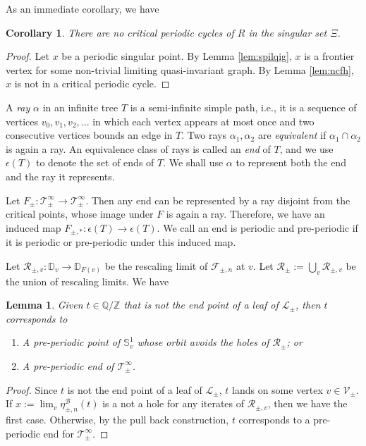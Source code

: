 \documentclass[11pt, reqno]{amsart}
\numberwithin{equation}{section}
\theoremstyle{plain}
\theoremstyle{theorem}
\newtheorem{lem}[theorem]{Lemma}
\newtheorem{cor}[theorem]{Corollary}
\theoremstyle{definition}
\newcommand{\Q}{\mathbb{Q}}
\newcommand{\Z}{\mathbb{Z}}
\newcommand{\D}{\mathbb{D}}
\newcommand{\bp}{\mathcal{F}}
\newcommand{\rl}{\mathcal{R}}
\numberwithin{figure}{section}
\begin{document}
As an immediate corollary, we have
\begin{cor}\label{cor:ncpcs}
There are no critical periodic cycles of $R$ in the singular set $\Xi$.
\end{cor}
\begin{proof}
Let $x$ be a periodic singular point.
By Lemma \ref{lem:spilqig}, $x$ is a frontier vertex for some non-trivial limiting quasi-invariant graph. By Lemma \ref{lem:ncfh}, $x$ is not in a critical periodic cycle.
\end{proof}



A {\em ray} $\alpha$ in an infinite tree $T$ is a semi-infinite simple path, i.e., it is a sequence of vertices $v_0,v_1,v_2,...$ in which each vertex appears at most once and two consecutive vertices bounds an edge in $T$.
Two rays $\alpha_1, \alpha_2$ are {\em equivalent} if $\alpha_1 \cap \alpha_2$ is again a ray.
An equivalence class of rays is called an {\em end} of $T$, and we use $\epsilon(T)$ to denote the set of ends of $T$.
We shall use $\alpha$ to represent both the end and the ray it represents.

Let $F_\pm: \mathcal{T}_\pm^\infty \longrightarrow \mathcal{T}_\pm^\infty$.
Then any end can be represented by a ray disjoint from the critical points, whose image under $F$ is again a ray.
Therefore, we have an induced map $F_{\pm,*}: \epsilon(T) \longrightarrow \epsilon(T)$.
We call an end is periodic and pre-periodic if it is periodic or pre-periodic under this induced map.

Let $\rl_{\pm, v} : \D_v \longrightarrow \D_{F(v)}$ be the rescaling limit of $\bp_{\pm,n}$ at $v$.
Let $\rl_\pm := \bigcup_v \rl_{\pm, v}$ be the union of rescaling limits. We have
\begin{lem}\label{lem:pppe}
Given $t\in \Q/\Z$ that is not the end point of a leaf of $\mathcal{L}_\pm$, then $t$ corresponds to 
\begin{enumerate}
\item A pre-periodic point of $\mathbb{S}^1_v$ whose orbit avoids the holes of $\rl_\pm$; or
\item A pre-periodic end of $\mathcal{T}_\pm^\infty$.
\end{enumerate}
\end{lem}
\begin{proof}
Since $t$ is not the end point of a leaf of $\mathcal{L}_\pm$, $t$ lands on some vertex $v\in\mathcal{V}_\pm$.
If $x:=\lim_v \eta^\mathcal{B}_{\pm, n}(t)$ is a not a hole for any iterates of $\rl_{\pm,v}$, then we have the first case.
Otherwise, by the pull back construction, $t$ corresponds to a pre-periodic end for $\mathcal{T}_\pm^\infty$.
\end{proof}
\end{document}
